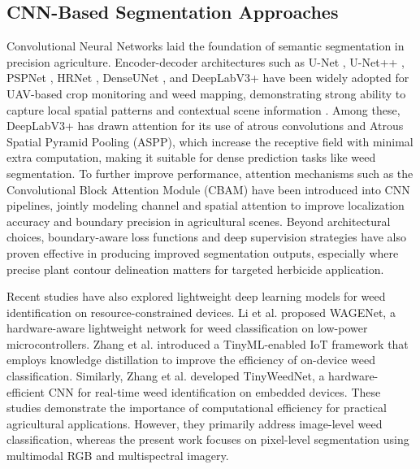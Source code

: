 \documentclass[pdflatex,sn-mathphys-num]{sn-jnl}
\newenvironment{revblock}{\color{revisionblue}}{}
\begin{document}
\subsection{CNN-Based Segmentation Approaches}
Convolutional Neural Networks laid the foundation of semantic segmentation in precision agriculture. Encoder-decoder architectures such as U-Net \cite{ronneberger2015unet}, U-Net++ \cite{zhou2018unet++}, PSPNet \cite{zhao2017pyramid}, HRNet \cite{sun2019high}, DenseUNet \cite{safarov2021denseunet}, and DeepLabV3+ \cite{chen2018Deeplabv3plus} have been widely adopted for UAV-based crop monitoring and weed mapping, demonstrating strong ability to capture local spatial patterns and contextual scene information \cite{silva2024deep}. Among these, DeepLabV3+ has drawn attention for its use of atrous convolutions and Atrous Spatial Pyramid Pooling (ASPP), which increase the receptive field with minimal extra computation, making it suitable for dense prediction tasks like weed segmentation\cite{chen2018Deeplabv3plus}. To further improve performance, attention mechanisms such as the Convolutional Block Attention Module (CBAM)\cite{woo2018cbam} have been introduced into CNN pipelines, jointly modeling channel and spatial attention to improve localization accuracy and boundary precision in agricultural scenes\cite{li2022attention_agriculture}. Beyond architectural choices, boundary-aware loss functions and deep supervision strategies have also proven effective in producing improved segmentation outputs, especially where precise plant contour delineation matters for targeted herbicide application. 

\begin{revblock}
Recent studies have also explored lightweight deep learning
models for weed identification on resource-constrained
devices. Li et al. \cite{li2026wagenet} proposed WAGENet,
a hardware-aware lightweight network for weed
classification on low-power microcontrollers.
Zhang et al. \cite{zhang2026tinymlkd} introduced a
TinyML-enabled IoT framework that employs knowledge
distillation to improve the efficiency of on-device
weed classification. Similarly, Zhang et al.
\cite{zhang2026tinyweednet} developed TinyWeedNet,
a hardware-efficient CNN for real-time weed
identification on embedded devices. These studies
demonstrate the importance of computational efficiency
for practical agricultural applications. However,
they primarily address image-level weed classification,
whereas the present work focuses on pixel-level
segmentation using multimodal RGB and multispectral
imagery.
\end{revblock}
\end{document}
